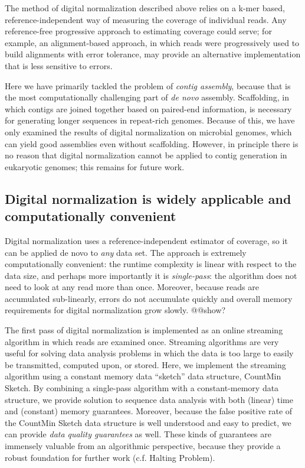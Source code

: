 \documentclass[10pt]{article}
\begin{document}
The method of digital normalization described above relies on a k-mer
based, reference-independent way of measuring the coverage of
individual reads.  Any reference-free progressive approach to
estimating coverage could serve; for example, an alignment-based
approach, in which reads were progressively used to build alignments
with error tolerance, may provide an alternative implementation that
is less sensitive to errors.

Here we have primarily tackled the problem of {\em contig assembly},
because that is the most computationally challenging part of {\em de
  novo} assembly.  Scaffolding, in which contigs are joined together
based on paired-end information, is necessary for generating longer
sequences in repeat-rich genomes.  Because of this, we have only
examined the results of digital normalization on microbial genomes,
which can yield good assemblies even without scaffolding.  However, in
principle there is no reason that digital normalization cannot be
applied to contig generation in eukaryotic genomes; this remains for
future work.

\subsection*{Digital normalization is widely applicable and computationally convenient}

Digital normalization uses a reference-independent estimator of
coverage, so it can be applied de novo to {\em any} data set.  The
approach is extremely computationally convenient: the runtime
complexity is linear with respect to the data size, and perhaps more
importantly it is {\em single-pass}: the algorithm does not need to
look at any read more than once.  Moreover, because reads are
accumulated sub-linearly, errors do not accumulate quickly and overall
memory requirements for digital normalization grow slowly. @@show?

The first pass of digital normalization is implemented as an online streaming
algorithm in which reads are examined once.  Streaming algorithms are very useful for solving data analysis
problems in which the data is too large to easily be transmitted,
computed upon, or stored.  Here, we implement the streaming algorithm
using a constant memory data ``sketch'' data structure, CountMin
Sketch.  By combining a single-pass algorithm with a constant-memory
data structure, we provide solution to sequence data analysis with
both (linear) time and (constant) memory guarantees. Moreover, because
the false positive rate of the CountMin Sketch data structure is well
understood and easy to predict, we can provide {\em data quality
guarantees} as well.  These kinds of guarantees are immensely
valuable from an algorithmic perspective, because they provide a
robust foundation for further work (c.f. Halting Problem).
\end{document}
